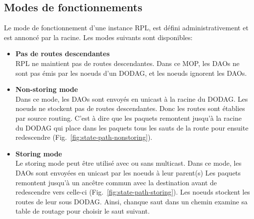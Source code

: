 

\subsection*{Modes de fonctionnements}\label{subsec:state-mop}
    Le mode de fonctionnement d'une instance RPL, est défini administrativement et est annoncé par la racine. Les modes suivants sont disponibles:
    \begin{itemize}
        \item \textbf{Pas de routes descendantes}\\
            RPL ne maintient pas de routes descendantes. Dans ce MOP, les DAOs ne sont pas émis par les noeuds d'un DODAG, et les noeuds ignorent les DAOs.
        \item \textbf{Non-storing mode}\\
            Dans ce mode, les DAOs sont envoyés en unicast à la racine du DODAG.
            Les noeuds ne stockent pas de routes descendantes. Donc les routes sont établies par source routing. C'est à dire que les paquets remontent jusqu'à la racine du DODAG qui place dans les paquets tous les sauts de la route pour ensuite redescendre (Fig.~\ref{fig:state-path-nonstoring}).
        \item \textbf{Storing mode}\\
            Le storing mode peut être utilisé avec ou sans multicast.
            Dans ce mode, les DAOs sont envoyées en unicast par les noeuds à leur parent(s)
            Les paquets remontent jusqu'à un ancêtre commun avec la destination avant de redescendre vers celle-ci (Fig.~\ref{fig:state-path-storing}).
            Les noeuds stockent les routes de leur sous DODAG. Ainsi, chanque saut dans un chemin examine sa table de routage pour choisir le saut suivant.
    \end{itemize}
    

